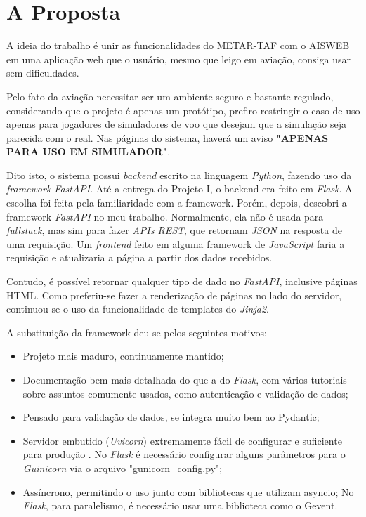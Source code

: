 \chapter{A Proposta}
A ideia do trabalho é unir as funcionalidades do METAR-TAF com o AISWEB em uma 
aplicação web que o usuário, mesmo que leigo em aviação, consiga usar sem 
dificuldades.

Pelo fato da aviação necessitar ser um ambiente seguro e bastante regulado, considerando
que o projeto é apenas um protótipo, prefiro restringir o caso de uso apenas
para jogadores de simuladores de voo que desejam que a simulação seja parecida
com o real. Nas páginas do sistema, haverá um aviso \textbf{"APENAS PARA USO EM SIMULADOR"}.

Dito isto, o sistema possui \textit{backend} escrito na linguagem \textit{Python}, 
fazendo uso da 
\textit{framework \textit{FastAPI}}. Até a entrega do Projeto I, o backend era feito em \textit{Flask}. 
A escolha foi feita pela familiaridade com a framework. Porém, depois, 
descobri a framework \textit{FastAPI} no meu trabalho. Normalmente, ela não é usada para 
\textit{fullstack}, mas sim para fazer \textit{APIs REST}, que retornam \textit{JSON} na resposta de uma 
requisição. Um \textit{frontend} feito em alguma framework de \textit{JavaScript} faria a requisição
 e atualizaria a página a partir dos dados recebidos.

Contudo, é possível retornar qualquer tipo de dado no \textit{\textit{FastAPI}}, inclusive páginas 
HTML. Como preferiu-se fazer a renderização de páginas no lado do servidor, continuou-se
o uso da funcionalidade de templates do \textit{\textit{Jinja2}}.

A substituição da framework deu-se pelos seguintes motivos:

\begin{itemize}
\item Projeto mais maduro, continuamente mantido;
\item Documentação bem mais detalhada do que a do \textit{Flask}, com vários tutoriais sobre assuntos comumente usados, como autenticação e validação de dados;
\item Pensado para validação de dados, se integra muito bem ao Pydantic;
\item Servidor embutido (\textit{\textit{Uvicorn}}) extremamente fácil de configurar e suficiente para produção \cite{fast-api-prod}.
No \textit{Flask} é necessário configurar alguns parâmetros para o \textit{Guinicorn} via o arquivo "gunicorn\_config.py";
\item Assíncrono, permitindo o uso junto com bibliotecas que utilizam asyncio;
No \textit{Flask}, para paralelismo, é necessário usar uma biblioteca como o Gevent.
\end{itemize}

